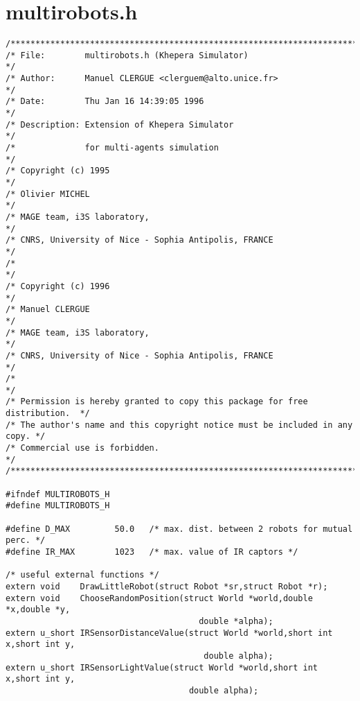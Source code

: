 \documentclass[a4paper,twoside]{article}
\begin{document}
\section{multirobots.h \label{multi_h}}
{\small
\begin{verbatim}
/*****************************************************************************/
/* File:        multirobots.h (Khepera Simulator)                            */
/* Author:      Manuel CLERGUE <clerguem@alto.unice.fr>                      */
/* Date:        Thu Jan 16 14:39:05 1996                                     */
/* Description: Extension of Khepera Simulator                               */
/*              for multi-agents simulation                                  */
/* Copyright (c) 1995                                                        */
/* Olivier MICHEL                                                            */
/* MAGE team, i3S laboratory,                                                */
/* CNRS, University of Nice - Sophia Antipolis, FRANCE                       */
/*                                                                           */
/* Copyright (c) 1996                                                        */
/* Manuel CLERGUE                                                            */
/* MAGE team, i3S laboratory,                                                */
/* CNRS, University of Nice - Sophia Antipolis, FRANCE                       */
/*                                                                           */
/* Permission is hereby granted to copy this package for free distribution.  */
/* The author's name and this copyright notice must be included in any copy. */
/* Commercial use is forbidden.                                              */
/*****************************************************************************/

#ifndef MULTIROBOTS_H
#define MULTIROBOTS_H

#define D_MAX         50.0   /* max. dist. between 2 robots for mutual perc. */
#define IR_MAX        1023   /* max. value of IR captors */

/* useful external functions */
extern void    DrawLittleRobot(struct Robot *sr,struct Robot *r);
extern void    ChooseRandomPosition(struct World *world,double *x,double *y,
                                       double *alpha);
extern u_short IRSensorDistanceValue(struct World *world,short int x,short int y,
                                        double alpha);
extern u_short IRSensorLightValue(struct World *world,short int x,short int y,
                                     double alpha);



\end{verbatim}}
\end{document}
